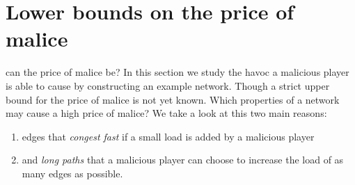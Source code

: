 \section{Lower bounds on the price of malice}

 can the price of malice be?
In this section we study the havoc a malicious player is able to cause by constructing an example network.
Though a strict upper bound for the price of malice is not yet known.
Which properties of a network may cause a high price of malice?
We take a look at this two main reasons:
\begin{enumerate}
	\item edges that \emph{congest fast} if a small load is added by a malicious player
	\item and \emph{long paths} that a malicious player can choose to increase the load of as many edges as possible.
\end{enumerate}